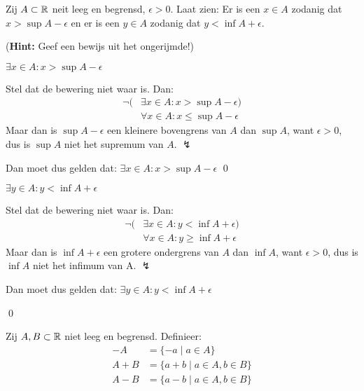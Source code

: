 \documentclass[week=1]{homework}
\begin{document}
\begin{questions}
        \question
        Zij $A \subset \mathbb{R}$ neit leeg en begrensd, $\epsilon > 0$. Laat zien: Er is een $x \in A$ zodanig dat $x > \sup A - \epsilon$ en er is een $y \in A$ zodanig dat $y < \inf A + \epsilon$.
        
        (\textbf{Hint:} Geef een bewijs uit het ongerijmde!)
        
        \toprove $\exists x \in A: x > \sup A - \epsilon$
               
        \proof 
        Stel dat de bewering niet waar is. Dan:
        \begin{align*}
        	\neg(&\exists x \in A: x > \sup A - \epsilon) \\
        	&\forall x \in A: x \le \sup A - \epsilon 
        \end{align*}
        Maar dan is $\sup A - \epsilon$ een kleinere bovengrens van $A$ dan $\sup A$, want $\epsilon > 0$, dus is $\sup A$ niet het supremum van $A$. $\lightning$
        
        Dan moet dus gelden dat: $\exists x \in A: x > \sup A - \epsilon$
        \qed
        
        \toprove $\exists y \in A: y < \inf A + \epsilon$
        
        \proof 
        Stel dat de bewering niet waar is. Dan: 
        \begin{align*}
        	\neg(&\exists x \in A: y < \inf A + \epsilon) \\
        	&\forall x \in A: y \ge \inf A + \epsilon
        \end{align*}
        Maar dan is $\inf A + \epsilon$ een grotere ondergrens van $A$ dan $\inf A$, want $\epsilon > 0$, dus is $\inf A$ niet het infimum van A. $\lightning$
        
        Dan moet dus gelden dat: $\exists y \in A: y < \inf A + \epsilon$
        
        \qed
        
        \question
        
        Zij $A,B \subset \mathbb{R}$ niet leeg en begrensd. Definieer:
        \begin{align*}
	        -A &= \{-a \mid a \in A\} \\
		    A + B &= \{a + b \mid a \in A, b \in B\} \\
			A - B &= \{a - b \mid a \in A, b \in B\}
        \end{align*}
        

\end{questions}
\end{document}
